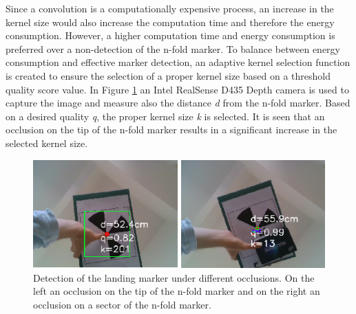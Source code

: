 \documentclass[conference, onecolumn, draftclsnofoot]{IEEEtran}
\begin{document}

Since a convolution is a computationally expensive process, an increase
in the kernel size would also increase the computation time and
therefore the energy consumption. However, a higher computation time and energy consumption
is preferred over a non-detection of the n-fold marker. To balance
between energy consumption and effective marker detection, an adaptive
kernel selection function is created to ensure the selection of a
proper kernel size based on a threshold quality score value. In Figure
\ref{fig:NfoldOcclusions} an Intel RealSense D435 Depth camera is used
to capture the image and measure also the distance \emph{d} from the n-fold
marker. Based on a desired quality \emph{q}, the proper kernel size \emph{k} is
selected. It is seen that an occlusion on the tip of the n-fold marker
results in a significant increase in the selected kernel size.




%

\begin{figure}[t]
\centering
\includegraphics[scale=0.25]{nfold_occlusions.png}
\caption{Detection of the landing marker under different
  occlusions. On the left an occlusion on the tip of the n-fold marker
  and on the right an occlusion on a sector of the n-fold marker.}
\label{fig:NfoldOcclusions}
\end{figure}
\end{document}
